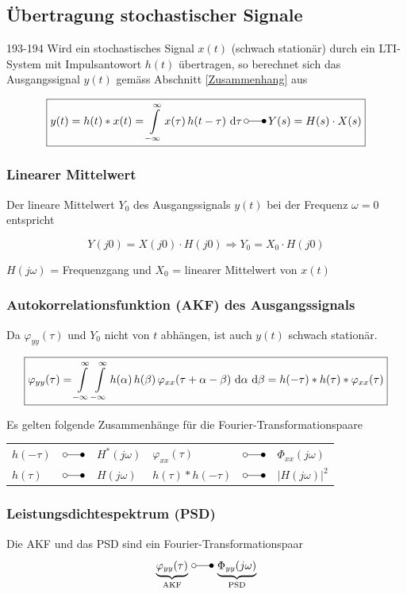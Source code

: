 \subsection{Übertragung stochastischer Signale}{193-194}
Wird ein stochastisches Signal $x(t)$ (schwach stationär) durch ein LTI-System mit Impulsantowort $h(t)$ übertragen, so berechnet
sich das Ausgangssignal $y(t)$ gemäss Abschnitt \ref{Zusammenhang} aus

$$ \boxed{ y(t) = h(t) * x(t) = \int\limits_{- \infty}^{\infty} x(\tau) \, h(t - \tau) \, \diff \tau  \, 
\laplace \, Y(s) = H(s) \cdot X(s) } $$


\subsubsection{Linearer Mittelwert}
Der lineare Mittelwert $Y_0$ des Ausgangssignals $y(t)$ bei der Frequenz $\omega = 0$ entspricht

$$ \boxed{ Y(j0) = X(j0) \cdot H(j0) \Rightarrow Y_0 = X_0 \cdot H(j0) } $$

$H(j \omega)$ = Frequenzgang und $X_0$ = linearer Mittelwert von $x(t)$ 


\subsubsection{Autokorrelationsfunktion (AKF) des Ausgangssignals}
Da $\varphi_{yy}(\tau)$ und $Y_0$ nicht von $t$ abhängen, ist auch $y(t)$ schwach stationär.

$$ \boxed{ \varphi_{yy}(\tau) = \int\limits_{- \infty}^{\infty} \int\limits_{- \infty}^{\infty} h(\alpha) \, h(\beta) \, \varphi_{xx}(\tau + \alpha - \beta) \, \mathop{} \! \mathrm{d} \alpha \, \mathop{} \! \mathrm{d} \beta 
= h(-\tau) * h(\tau) * \varphi_{xx}(\tau) } $$

Es gelten folgende Zusammenhänge für die Fourier-Transformationspaare \\

\begin{tabular}{l c l | l c l}
    $h(-\tau)$              & $\laplace$ & $H^*(j \omega)$      & $\varphi_{xx}(\tau)$ & $\laplace$ & $\Phi_{xx}(j \omega)$ \\
    $h(\tau)$               & $\laplace$ & $H(j \omega)$        & $h(\tau) * h(-\tau)$ & $\laplace$ & $|H(j \omega)|^2$
\end{tabular}


\subsubsection{Leistungsdichtespektrum (PSD)}
Die AKF und das PSD sind ein Fourier-Transformationspaar
$$ \underbrace{\varphi_{yy}(\tau)}_{\text{AKF}} \, \laplace \, \underbrace{\Phi_{yy}(j \omega)}_{\text{PSD}} $$

